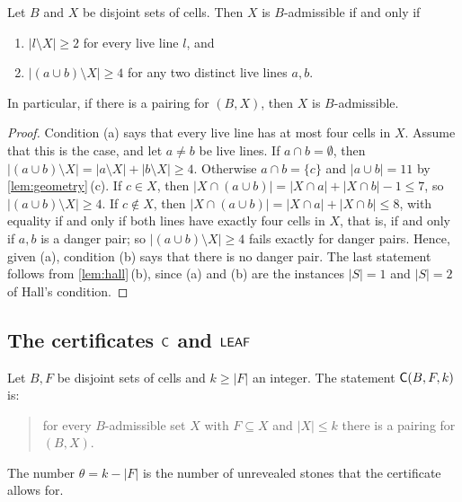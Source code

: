 \begin{lemma}\label{lem:one-two}
Let $B$ and $X$ be disjoint sets of cells. Then $X$ is $B$-admissible if and only if
\begin{enumerate}[label=\textup{(\alph*)}]
\item $|l\setminus X|\ge 2$ for every live line $l$, and
\item $|(a\cup b)\setminus X|\ge 4$ for any two distinct live lines $a,b$.
\end{enumerate}
In particular, if there is a pairing for $(B,X)$, then $X$ is $B$-admissible.
\end{lemma}

\begin{proof}
Condition (a) says that every live line has at most four cells in $X$. Assume that this is the case, and
let $a\ne b$ be live lines. If $a\cap b=\emptyset$, then $|(a\cup b)\setminus X|=|a\setminus X|+|b\setminus
X|\ge 4$. Otherwise $a\cap b=\{c\}$ and $|a\cup b|=11$ by \cref{lem:geometry}\,(c). If $c\in X$, then
$|X\cap(a\cup b)|=|X\cap a|+|X\cap b|-1\le 7$, so $|(a\cup b)\setminus X|\ge 4$. If $c\notin X$, then
$|X\cap(a\cup b)|=|X\cap a|+|X\cap b|\le 8$, with equality if and only if both lines have exactly four
cells in $X$, that is, if and only if $a,b$ is a danger pair; so $|(a\cup b)\setminus X|\ge 4$ fails
exactly for danger pairs. Hence, given (a), condition (b) says that there is no danger pair. The last
statement follows from \cref{lem:hall}\,(b), since (a) and (b) are the instances $|S|=1$ and $|S|=2$ of
Hall's condition.
\end{proof}

\subsection{The certificates \texorpdfstring{$\mathsf{C}$}{C} and \texorpdfstring{$\mathsf{LEAF}$}{LEAF}}\label{ssec:certs}

\begin{definition}\label{def:C}
Let $B,F$ be disjoint sets of cells and $k\ge|F|$ an integer. The statement $\mathsf{C}(B,F,k)$ is:
\begin{quote}
for every $B$-admissible set $X$ with $F\subseteq X$ and $|X|\le k$ there is a pairing for $(B,X)$.
\end{quote}
The number $\theta=k-|F|$ is the number of unrevealed stones that the certificate allows for.
\end{definition}

